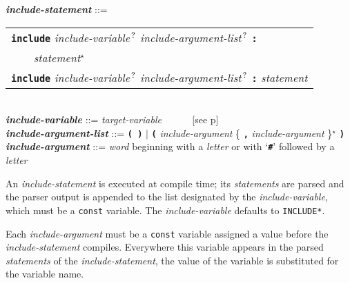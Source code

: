 \documentclass[12pt]{article}
\newcommand{\TT}[1]{{\tt \bfseries #1}}
\newcommand{\STAR}{{\Large $^\star$}}
\newcommand{\QMARK}{{$^{\,\mbox{\footnotesize ?}}$}}
\newcommand{\emkey}[1]{{\em \bfseries #1}}
\newcommand{\pagref}[1]{p\pageref{#1}}
\newenvironment{indpar}[1][0.3in]%
	{\begin{list}{}%
		     {\setlength{\itemsep}{0in}%
		      \setlength{\topsep}{0in}%
		      \setlength{\parsep}{1ex}%
		      \setlength{\labelwidth}{#1}%
		      \setlength{\leftmargin}{#1}%
		      \addtolength{\leftmargin}{\labelsep}}%
	 \item}%
	{\end{list}}
\begin{document}
\begin{indpar}
\emkey{include-statement}\label{INCLUDE-STATEMENT} ::= \\
\hspace*{0.3in}
    \begin{tabular}[t]{l}
    \TT{include} {\em include-variable}\QMARK{}
    	{\em include-argument-list}\QMARK{} \TT{:} \\
    \TT{~~~~}{\em statement}\STAR{} \\
    \TT{include}  {\em include-variable}\QMARK{}
    	{\em include-argument-list}\QMARK{} \TT{:}
	{\em statement} \\
    \end{tabular}
\\[0.5ex]
\emkey{include-variable} ::= {\em target-variable}
	~~~~~ [see \pagref{TARGET-VARIABLE}]
\\[0.5ex]
\emkey{include-argument-list} ::= \TT{( )} $|$
	\TT{(} {\em include-argument}
	\{ \TT{,} {\em include-argument} \}\STAR{} \TT{)}
\\[0.5ex]
\emkey{include-argument} ::= {\em word} beginning with a {\em letter} or
	with `\TT{\#}' followed by a {\em letter}

\end{indpar}

An {\em include-statement} is executed at compile time;
its {\em statements} are parsed and the parser output is
appended to the list designated by the {\em include-variable},
which must be a {\tt const} variable.  The {\em include-variable}
defaults to {\tt *INCLUDE*}.

Each {\em include-argument} must be a {\tt const} variable assigned
a value before the {\em include-state\-ment} compiles.
Everywhere this variable
appears in the parsed {\em statements} of the {\em include-statement},
the value of the variable is substituted for the variable name.
\end{document}
